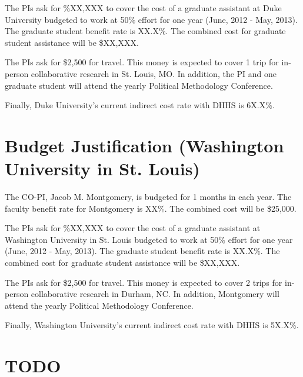 \documentclass[pdftex,12pt,fullpage,oneside]{amsart}
\begin{document}
The PIs ask for \%XX,XXX to cover the cost of a graduate assistant at
Duke University budgeted to work at 50\% effort for one year (June,
2012 - May, 2013).  The graduate student benefit rate is XX.X\%.  The
combined cost for graduate student assistance will be \$XX,XXX.

The PIs ask for \$2,500 for travel.  This money is expected to cover 1
trip for in-person collaborative research in St. Louis, MO.  In addition,
the PI and one graduate student will attend the yearly Political
Methodology Conference.

Finally, Duke University's current indirect cost rate with DHHS is 6X.X\%.



\newpage
\setcounter{page}{1}
\thispagestyle{empty}

\section*{Budget Justification (Washington University in St. Louis)}

The CO-PI, Jacob M. Montgomery, is budgeted for 1 months in each year.  The
faculty benefit rate for Montgomery is XX\%.   The combined cost will
be \$25,000.

The PIs ask for \%XX,XXX to cover the cost of a graduate assistant at
Washington University in St. Louis budgeted to work at 50\% effort for one year
(June, 2012 - May, 2013).  The graduate student benefit rate is
XX.X\%.  The combined cost for graduate student assistance will be
\$XX,XXX.

The PIs ask for \$2,500 for travel.  This money is expected to cover 2
trips for in-person collaborative research in Durham, NC.  In
addition, Montgomery will attend the yearly Political Methodology
Conference.

Finally, Washington University's current indirect cost rate with DHHS is 5X.X\%.

\newpage
\setcounter{page}{1}
\section*{TODO}
\end{document}
